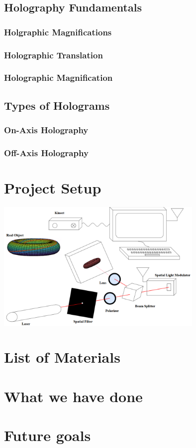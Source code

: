\documentclass{article}
\begin{document}
\subsection{Holography Fundamentals}

\subsubsection{Holgraphic Magnifications}
\subsubsection{Holographic Translation}
\subsubsection{Holographic Magnification}

\subsection{Types of Holograms}
\subsubsection{On-Axis Holography}
\subsubsection{Off-Axis Holography}

\section{Project Setup}

\begin{center}
\includegraphics[width=100mm]{tupac10.png}
\end{center}

\section{List of Materials}

\section{What we have done}

\section{Future goals}
\end{document}
